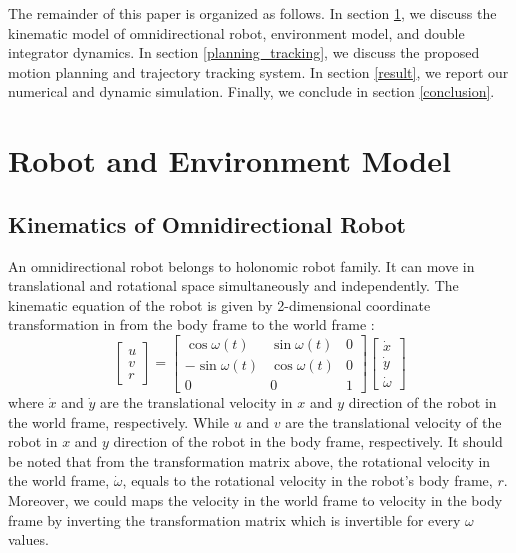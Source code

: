 \documentclass[conference]{IEEEtran}
\begin{document}
The remainder of this paper is organized as follows. In section \ref{modeling}, we discuss the kinematic model of omnidirectional robot, environment model, and double integrator dynamics. In section \ref{planning_tracking}, we discuss the proposed motion planning and trajectory tracking system. In section \ref{result}, we report our numerical and dynamic simulation. Finally, we conclude in section \ref{conclusion}.

\section{Robot and Environment Model} \label{modeling}

\subsection{Kinematics of Omnidirectional Robot}

An omnidirectional robot belongs to holonomic robot family. It can move in translational and rotational space simultaneously and independently. The kinematic equation of the robot is given by 2-dimensional coordinate transformation in from the body frame to the world frame :
\begin{equation} \label{omnirobot_eq}
\begin{bmatrix}
u\\
v\\
r
\end{bmatrix}
=
\begin{bmatrix}
\cos{\omega(t)} & \sin{\omega(t)} & 0 \\
-\sin{\omega(t)} & \cos{\omega(t)} & 0 \\
0 & 0 & 1
\end{bmatrix}
\begin{bmatrix}\dot{x}
\\ \dot{y}
\\ \dot{\omega}
\end{bmatrix}
\end{equation}
where $\dot{x}$ and $\dot{y}$ are the translational velocity in $x$ and $y$ direction of the robot in the world frame, respectively. While $u$ and $v$ are the translational velocity of the robot in $x$ and $y$ direction of the robot in the body frame, respectively. It should be noted that from the transformation matrix above, the rotational velocity in the world frame, $\dot{\omega}$, equals to the rotational velocity in the robot's body frame, $r$. Moreover, we could maps the velocity in the world frame to velocity in the body frame by inverting the transformation matrix which is invertible for every $\omega$ values.
\end{document}
